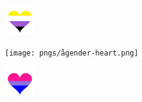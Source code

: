 \documentclass{article}
\begin{document}




\includegraphics[width=0.1\textwidth]{pngs/enby-heart.png}

\texttt{[image: pngs/ågender-heart.png]}

\includegraphics[width=0.1\textwidth]{pngs 1/bi heart.png}
\end{document}
